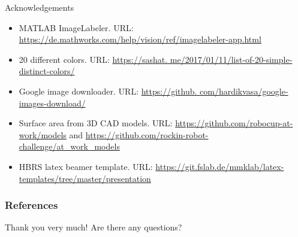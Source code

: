\documentclass{beamer}
\begin{document}
\begin{frame}{Acknowledgements}
		\begin{itemize}
			\item MATLAB ImageLabeler. URL: \url{https://de.mathworks.com/help/vision/ref/imagelabeler-app.html}
			\item 20 different colors. URL: \url{ https://sashat.
me/2017/01/11/list-of-20-simple-distinct-colors/}
			\item Google image downloader. URL: \url{ https://github.
com/hardikvasa/google-images-download/}
			\item Surface area from 3D CAD models. URL: \url{ https://github.com/robocup-at-work/models} and \url{https://github.com/rockin-robot-challenge/at_work_models}
			\item HBRS latex beamer template. URL: \url{https://git.fslab.de/mmklab/latex-templates/tree/master/presentation}
		\end{itemize}
\end{frame}

\begin{frame}
  \frametitle{References}
  \printbibliography[title={References}]	
\end{frame}

\begin{frame}{Thank you very much!}
Are there any questions? \\
\end{frame}
\end{document}
